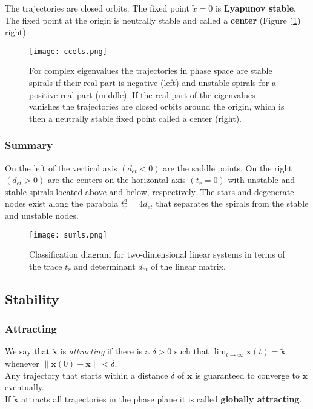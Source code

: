 \begin{enumerate}[label=\textbf{(\Alph*)}]
\begin{itemize}
			The trajectories are closed orbits.
			The fixed point $\tilde{x}=0$ is {\textbf{Lyapunov stable}}.
			The fixed point at the origin is neutrally stable and called a {\textbf{center}} (Figure (\ref{fig:ccels}) right).
			\begin{figure}[H]
				\centering
				\texttt{[image: ccels.png]}
				\caption{For complex eigenvalues the trajectories in phase space are stable spirals if their real part is negative (left) and unstable spirals for a positive real part (middle). If the real part of the eigenvalues vanishes the trajectories are closed orbits around the origin, which is then a neutrally stable fixed point called a center (right).}
				\label{fig:ccels}
		    \end{figure}	
		\end{itemize}		
\end{enumerate}
\subsubsection{Summary}
On the left of the vertical axis $(d_{et}<0)$ are the saddle points.
On the right $(d_{et}>0)$ are the centers on the horizontal axis $(t_r=0)$ with unstable and stable spirals located above and below, respectively.
The stars and degenerate nodes exist along the parabola $t_r^2=4d_{et}$ that separates the spirals from the stable and unstable nodes.
\begin{figure}[h!]
	\centering
	\texttt{[image: sumls.png]}
	\caption{Classification diagram for two-dimensional linear systems in terms of the trace $t_r$ and determinant $d_{et}$ of the linear matrix.}
	\label{fig:sumls}
\end{figure}
\subsection{Stability}
\subsubsection*{Attracting}
We say that $\mathbf{\tilde{x}}$ is \emph{attracting} if there is a $\delta>0$ such that $\displaystyle\lim_{t\rightarrow\infty}\mathbf{x}(t)=\mathbf{\tilde{x}}$ whenever $\|\mathbf{x}(0)-\mathbf{\tilde{x}}\|<\delta$.\\
Any trajectory that starts within a distance $\delta$ of $\mathbf{\tilde{x}}$ is guaranteed to converge to $\mathbf{\tilde{x}}$ eventually.\\
If $\mathbf{\tilde{x}}$ attracts all trajectories in the phase plane it is called {\textbf{globally attracting}}.
